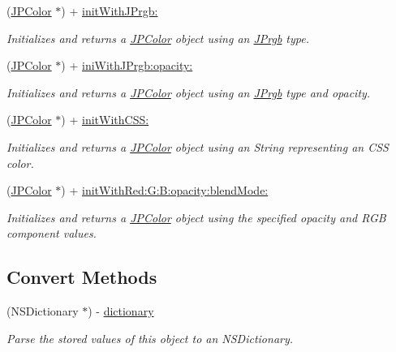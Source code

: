 \begin{DoxyCompactItemize}
(\hyperlink{interface_j_p_color}{JPColor} $\ast$) + \hyperlink{interface_j_p_color_a244c1758fdf57f4beb62a5884d5ad142}{initWithJPrgb:}
\begin{DoxyCompactList}\small\item\em Initializes and returns a \hyperlink{interface_j_p_color}{JPColor} object using an \hyperlink{struct_j_prgb}{JPrgb} type. \item\end{DoxyCompactList}\item 
(\hyperlink{interface_j_p_color}{JPColor} $\ast$) + \hyperlink{interface_j_p_color_a8cc0f1ebfd272fca56fbcc1e333c0cc1}{iniWithJPrgb:opacity:}
\begin{DoxyCompactList}\small\item\em Initializes and returns a \hyperlink{interface_j_p_color}{JPColor} object using an \hyperlink{struct_j_prgb}{JPrgb} type and opacity. \item\end{DoxyCompactList}\item 
(\hyperlink{interface_j_p_color}{JPColor} $\ast$) + \hyperlink{interface_j_p_color_a2a76a3cee7b52f969f29edd021fe66ee}{initWithCSS:}
\begin{DoxyCompactList}\small\item\em Initializes and returns a \hyperlink{interface_j_p_color}{JPColor} object using an String representing an CSS color. \item\end{DoxyCompactList}\item 
(\hyperlink{interface_j_p_color}{JPColor} $\ast$) + \hyperlink{interface_j_p_color_ae76fd408d66035ae1ccfe1fb8820e852}{initWithRed:G:B:opacity:blendMode:}
\begin{DoxyCompactList}\small\item\em Initializes and returns a \hyperlink{interface_j_p_color}{JPColor} object using the specified opacity and RGB component values. \item\end{DoxyCompactList}\end{DoxyCompactItemize}
\subsection*{Convert Methods}
\begin{DoxyCompactItemize}
\item 
(NSDictionary $\ast$) -\/ \hyperlink{interface_j_p_color_a4e9484ec16fc8b0fa4dcf51d705e1dc2}{dictionary}
\begin{DoxyCompactList}\small\item\em Parse the stored values of this object to an NSDictionary. \item\end{DoxyCompactList}\end{DoxyCompactItemize}

